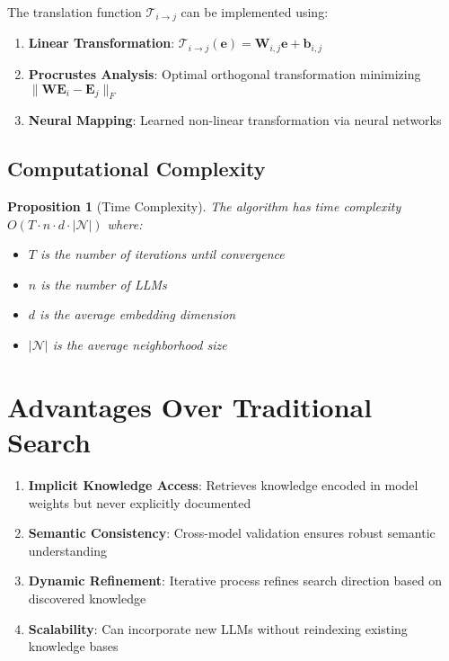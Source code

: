 \documentclass{article}
\newtheorem{proposition}{Proposition}
\begin{document}
The translation function $\mathcal{T}_{i \rightarrow j}$ can be implemented using:
\begin{enumerate}
\item \textbf{Linear Transformation}: $\mathcal{T}_{i \rightarrow j}(\mathbf{e}) = \mathbf{W}_{i,j}\mathbf{e} + \mathbf{b}_{i,j}$
\item \textbf{Procrustes Analysis}: Optimal orthogonal transformation minimizing $\|\mathbf{W}\mathbf{E}_i - \mathbf{E}_j\|_F$
\item \textbf{Neural Mapping}: Learned non-linear transformation via neural networks
\end{enumerate}

\subsection{Computational Complexity}

\begin{proposition}[Time Complexity]
The algorithm has time complexity $O(T \cdot n \cdot d \cdot |\mathcal{N}|)$ where:
\begin{itemize}
\item $T$ is the number of iterations until convergence
\item $n$ is the number of LLMs
\item $d$ is the average embedding dimension
\item $|\mathcal{N}|$ is the average neighborhood size
\end{itemize}
\end{proposition}

\section{Advantages Over Traditional Search}

\begin{enumerate}
\item \textbf{Implicit Knowledge Access}: Retrieves knowledge encoded in model weights but never explicitly documented
\item \textbf{Semantic Consistency}: Cross-model validation ensures robust semantic understanding
\item \textbf{Dynamic Refinement}: Iterative process refines search direction based on discovered knowledge
\item \textbf{Scalability}: Can incorporate new LLMs without reindexing existing knowledge bases
\end{enumerate}
\end{document}
